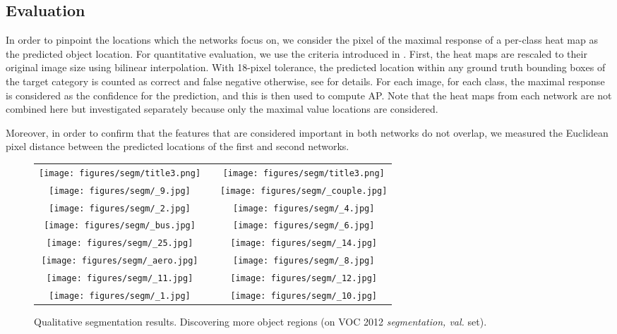 \documentclass[10pt,twocolumn,letterpaper]{article}
\begin{document}
\subsection{Evaluation}
In order to pinpoint the locations which the networks focus on, we consider the pixel of the maximal response of a per-class heat map as the predicted object location. For quantitative evaluation, we use the criteria introduced in \cite{Oquab15}. First, the heat maps are rescaled to their original image size using bilinear interpolation. With 18-pixel tolerance, the predicted location within any ground truth bounding boxes of the target category is counted as correct and false negative otherwise, see \cite{Oquab15} for details. For each image, for each class, the maximal response is considered as the confidence for the prediction, and this is then used to compute AP. Note that the heat maps from each network are not combined here but investigated separately because only the maximal value locations are considered.

Moreover, in order to confirm that the features that are considered important in both networks do not overlap, we measured the Euclidean pixel distance between the predicted locations of the first and second networks.

\begin{figure*}
\begin{center}
\def\arraystretch{0.5}
\begin{tabular}{@{}c@{\hskip 0.01\linewidth}c@{\hskip 0.01\linewidth}c}
\texttt{[image: figures/segm/title3.png]} &&
\texttt{[image: figures/segm/title3.png]} \\
\texttt{[image: figures/segm/\_9.jpg]} &&
\texttt{[image: figures/segm/\_couple.jpg]} \\
\texttt{[image: figures/segm/\_2.jpg]} &&
\texttt{[image: figures/segm/\_4.jpg]} \\
\texttt{[image: figures/segm/\_bus.jpg]} &&
\texttt{[image: figures/segm/\_6.jpg]} \\
\texttt{[image: figures/segm/\_25.jpg]} &&
\texttt{[image: figures/segm/\_14.jpg]} \\
\texttt{[image: figures/segm/\_aero.jpg]} &&
\texttt{[image: figures/segm/\_8.jpg]} \\
\texttt{[image: figures/segm/\_11.jpg]} &&
\texttt{[image: figures/segm/\_12.jpg]} \\
\texttt{[image: figures/segm/\_1.jpg]} &&
\texttt{[image: figures/segm/\_10.jpg]} \\
\end{tabular}
\end{center}
\vspace{-0.2in}
\caption{Qualitative segmentation results. Discovering more object regions (on VOC 2012 \textit{segmentation, val.} set).}
\label{fig:segm1}
\end{figure*}
\end{document}
